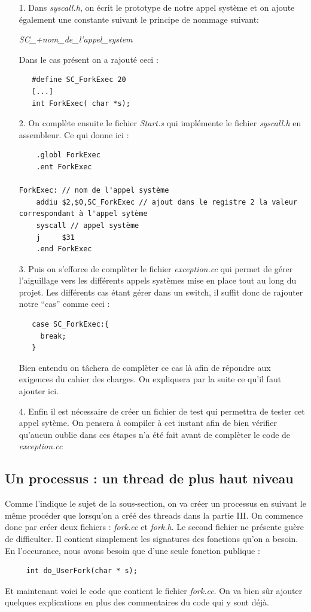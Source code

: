 \documentclass[a4paper,10pt]{article}
\begin{document}
  \begin{itemize}
   \item[1.] Dans \emph{syscall.h}, on écrit le prototype de notre appel système et on ajoute également une constante suivant le principe de nommage suivant:
   \begin{center}
   \emph{SC\_+nom\_de\_l'appel\_system}
   \end{center}
  Dans le cas présent on a rajouté ceci : 
  \begin{lstlisting}
   #define SC_ForkExec 20
   [...]
   int ForkExec( char *s);
  \end{lstlisting}
  \item[2.] On complète ensuite le fichier \emph{Start.s} qui implémente le fichier \emph{syscall.h} en assembleur. Ce qui donne ici :
  \begin{lstlisting}
   	.globl ForkExec
	.ent ForkExec

ForkExec: // nom de l'appel système
	addiu $2,$0,SC_ForkExec // ajout dans le registre 2 la valeur correspondant à l'appel sytème
	syscall // appel système
	j     $31
	.end ForkExec
  \end{lstlisting}
  \item[3.] Puis on s'efforce de complèter le fichier \emph{exception.cc} qui permet de gérer l'aiguillage vers les différents appels systèmes mise en place 
  tout au long du projet. Les différents cas étant gérer dans un switch, il suffit donc de rajouter notre ``cas'' comme ceci :
  \begin{lstlisting}
   case SC_ForkExec:{
     break;
   }
  \end{lstlisting}
  Bien entendu on tâchera de complèter ce cas là afin de répondre aux exigences du cahier des charges. On expliquera par la suite ce qu'il faut ajouter ici.
  
  \item[4.] Enfin il est nécessaire de créer un fichier de test qui permettra de tester cet appel sytème. On pensera à compiler à cet instant afin de bien 
  vérifier qu'aucun oublie dans ces étapes n'a été fait avant de complèter le code de \emph{exception.cc}
  \end{itemize}  
    \textcolor{NavyBlue}{\subsection{Un processus : un thread de plus haut niveau}}
    Comme l'indique le sujet de la sous-section, on va créer un processus en suivant le même procéder que lorsqu'on a créé des threads dans la partie III.
    On commence donc par créer deux fichiers : \emph{fork.cc} et \emph{fork.h}. Le second fichier ne présente guère de difficulter. Il contient simplement
    les signatures des fonctions qu'on a besoin. En l'occurance, nous avons besoin que d'une seule fonction publique :
    \begin{lstlisting}
     int do_UserFork(char * s);
    \end{lstlisting}
    Et maintenant voici le code que contient le fichier \emph{fork.cc}. On va bien sûr ajouter quelques explications en plus des commentaires du code qui 
    y sont déjà.
    
\end{document}
